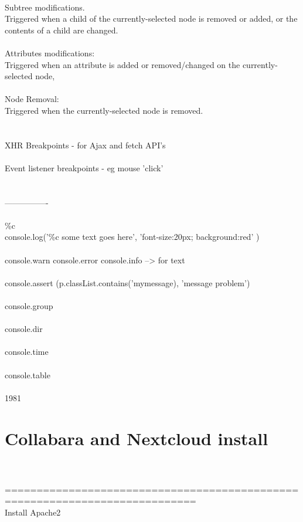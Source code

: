 \documentclass[10pt,a4paper]{article}
\begin{document}
{\\
Subtree modifications. \\
Triggered when a child of the currently-selected node is removed or added, or the contents of a child are changed.\\
\\
Attributes modifications: \\
Triggered when an attribute is added or removed/changed on the currently-selected node,\\
\\
Node Removal: \\
Triggered when the currently-selected node is removed.\\
\\
 \\
XHR Breakpoints - for Ajax and fetch API's\\
\\
Event listener breakpoints - eg mouse 'click' \\
\\
\\
----------------\\
\\
\%c\\
console.log('\%c  some text goes here', 'font-size:20px; background:red' )\\
\\
console.warn   console.error   console.info      -->   for text\\
\\
console.assert (p.classList.contains('mymessage), 'message problem')\\
\\
console.group\\
\\
console.dir\\
\\
console.time\\
\\
console.table\\
\\
}1981
\hypertarget{collabara_and_nextcloud_install}{\section {Collabara and Nextcloud install}}
{\Large }\\
\\
============================================================================{\large \\
Install Apache2}\\
\end{document}
